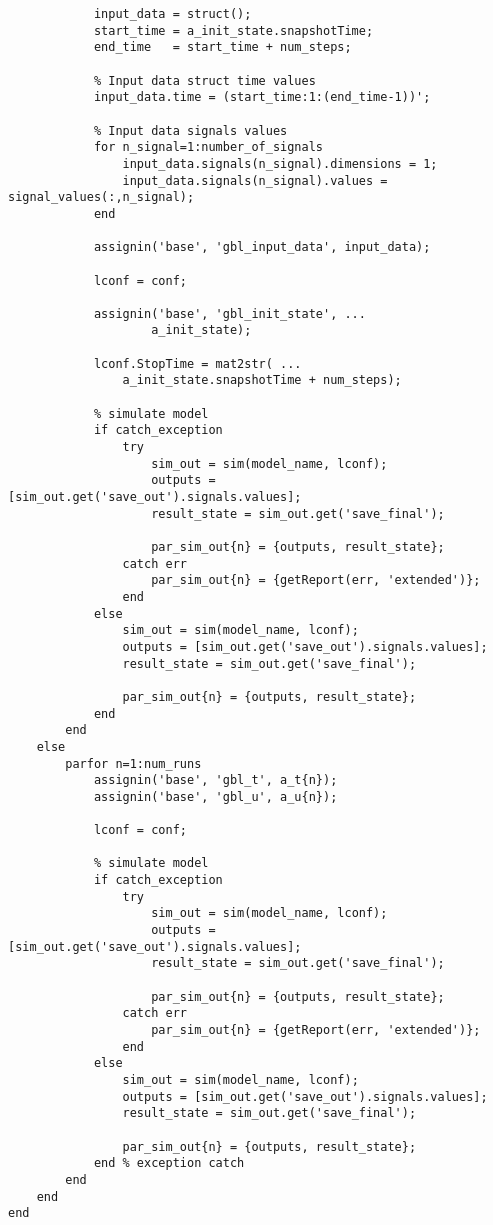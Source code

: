 \begin{lstlisting}
            input_data = struct();
            start_time = a_init_state.snapshotTime;
            end_time   = start_time + num_steps;
            
            % Input data struct time values
            input_data.time = (start_time:1:(end_time-1))';
            
            % Input data signals values
            for n_signal=1:number_of_signals
                input_data.signals(n_signal).dimensions = 1;
                input_data.signals(n_signal).values = signal_values(:,n_signal);
            end
                        
            assignin('base', 'gbl_input_data', input_data);

            lconf = conf;

            assignin('base', 'gbl_init_state', ...
                    a_init_state);   

            lconf.StopTime = mat2str( ...
                a_init_state.snapshotTime + num_steps);
    
            % simulate model
            if catch_exception
                try
                    sim_out = sim(model_name, lconf);
                    outputs = [sim_out.get('save_out').signals.values];
                    result_state = sim_out.get('save_final');

                    par_sim_out{n} = {outputs, result_state};
                catch err
                    par_sim_out{n} = {getReport(err, 'extended')};
                end
            else
                sim_out = sim(model_name, lconf);
                outputs = [sim_out.get('save_out').signals.values];
                result_state = sim_out.get('save_final');
                
                par_sim_out{n} = {outputs, result_state};
            end
        end
    else
        parfor n=1:num_runs
            assignin('base', 'gbl_t', a_t{n});
            assignin('base', 'gbl_u', a_u{n});

            lconf = conf;

            % simulate model
            if catch_exception
                try
                    sim_out = sim(model_name, lconf);
                    outputs = [sim_out.get('save_out').signals.values];
                    result_state = sim_out.get('save_final');
                    
                    par_sim_out{n} = {outputs, result_state};
                catch err
                    par_sim_out{n} = {getReport(err, 'extended')};
                end
            else
                sim_out = sim(model_name, lconf);
                outputs = [sim_out.get('save_out').signals.values];
                result_state = sim_out.get('save_final');
                
                par_sim_out{n} = {outputs, result_state};
            end % exception catch
        end
    end
end
\end{lstlisting}

